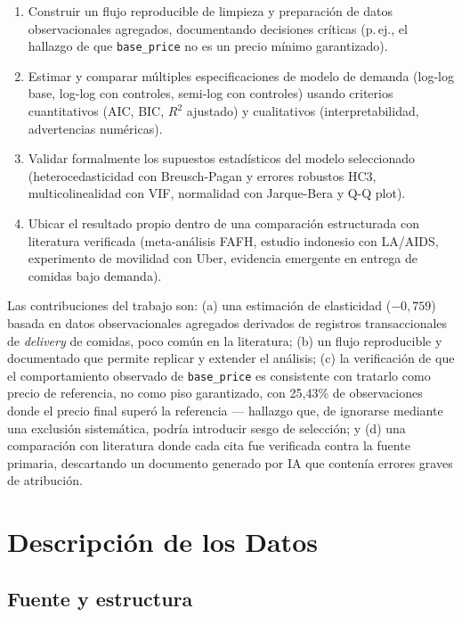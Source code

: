 \documentclass[doc, a4paper, biblatex, floatsintext, longtable, babel]{apa7}
\begin{document}
\begin{enumerate}
    \item Construir un flujo reproducible de limpieza y preparaci\'on de datos observacionales agregados, documentando decisiones cr\'iticas (p.\,ej., el hallazgo de que \texttt{base\_price} no es un precio m\'inimo garantizado).
    \item Estimar y comparar m\'ultiples especificaciones de modelo de demanda (log-log base, log-log con controles, semi-log con controles) usando criterios cuantitativos (AIC, BIC, $R^2$ ajustado) y cualitativos (interpretabilidad, advertencias num\'ericas).
    \item Validar formalmente los supuestos estad\'isticos del modelo seleccionado (heterocedasticidad con Breusch-Pagan y errores robustos HC3, multicolinealidad con VIF, normalidad con Jarque-Bera y Q-Q plot).
    \item Ubicar el resultado propio dentro de una comparaci\'on estructurada con literatura verificada (meta-an\'alisis FAFH, estudio indonesio con LA/AIDS, experimento de movilidad con Uber, evidencia emergente en entrega de comidas bajo demanda).
\end{enumerate}

Las contribuciones del trabajo son: (a) una estimaci\'on de elasticidad ($-0,759$) basada en datos observacionales agregados derivados de registros transaccionales de \textit{delivery} de comidas, poco com\'un en la literatura; (b) un flujo reproducible y documentado que permite replicar y extender el an\'alisis; (c) la verificaci\'on de que el comportamiento observado de \texttt{base\_price} es consistente con tratarlo como precio de referencia, no como piso garantizado, con 25,43\% de observaciones donde el precio final super\'o la referencia --- hallazgo que, de ignorarse mediante una exclusión sistemática, podría introducir sesgo de selección; y (d) una comparaci\'on con literatura donde cada cita fue verificada contra la fuente primaria, descartando un documento generado por IA que conten\'ia errores graves de atribuci\'on.

\section{Descripci\'on de los Datos}
\label{sec:descripcion_datos}

\subsection{Fuente y estructura}
\end{document}
